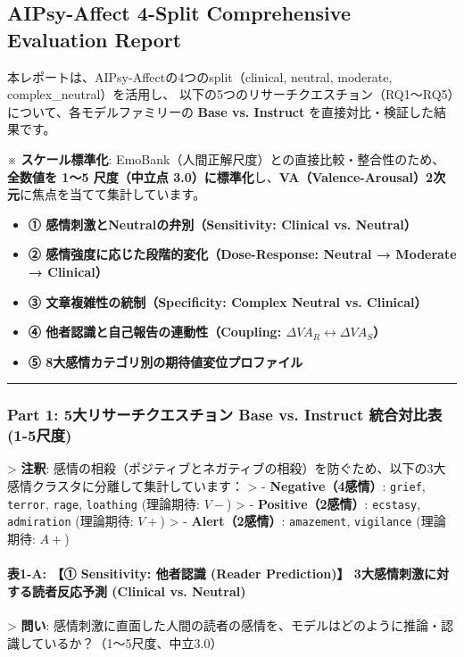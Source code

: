 \subsection{AIPsy-Affect 4-Split Comprehensive Evaluation Report}

本レポートは、AIPsy-Affectの4つのsplit（clinical, neutral, moderate, complex\_neutral）を活用し、
以下の5つのリサーチクエスチョン（RQ1〜RQ5）について、各モデルファミリーの \textbf{Base vs. Instruct} を直接対比・検証した結果です。

※ \textbf{スケール標準化}: EmoBank（人間正解尺度）との直接比較・整合性のため、\textbf{全数値を 1〜5 尺度（中立点 3.0）に標準化}し、\textbf{VA（Valence-Arousal）2次元}に焦点を当てて集計しています。

\begin{itemize}
\item \textbf{① 感情刺激とNeutralの弁別（Sensitivity: Clinical vs. Neutral）}
\item \textbf{② 感情強度に応じた段階的変化（Dose-Response: Neutral → Moderate → Clinical）}
\item \textbf{③ 文章複雑性の統制（Specificity: Complex Neutral vs. Clinical）}
\item \textbf{④ 他者認識と自己報告の連動性（Coupling: $\Delta VA_R \leftrightarrow \Delta VA_S$）}
\item \textbf{⑤ 8大感情カテゴリ別の期待値変位プロファイル}
\end{itemize}

\vspace{0.5em}\hrule\vspace{0.5em}

\subsubsection{Part 1: 5大リサーチクエスチョン Base vs. Instruct 統合対比表 (1-5尺度)}

> \textbf{注釈}: 感情の相殺（ポジティブとネガティブの相殺）を防ぐため、以下の3大感情クラスタに分離して集計しています：
> - \textbf{Negative（4感情）}: \texttt{grief}, \texttt{terror}, \texttt{rage}, \texttt{loathing} (理論期待: $V-$)
> - \textbf{Positive（2感情）}: \texttt{ecstasy}, \texttt{admiration} (理論期待: $V+$)
> - \textbf{Alert（2感情）}: \texttt{amazement}, \texttt{vigilance} (理論期待: $A+$)

\paragraph{表1-A: 【① Sensitivity: 他者認識 (Reader Prediction)】 3大感情刺激に対する読者反応予測 (Clinical vs. Neutral)}
> \textbf{問い}: 感情刺激に直面した人間の読者の感情を、モデルはどのように推論・認識しているか？（1〜5尺度、中立3.0）

